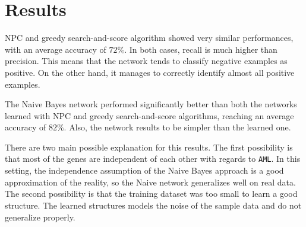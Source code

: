 \section{Results}
\label{sec:results}

NPC and greedy search-and-score algorithm showed very similar performances, with an average accuracy of $72\%$.
In both cases, recall is much higher than precision.
This means that the network tends to classify negative examples as positive.
On the other hand, it manages to correctly identify almost all positive examples.

The Naive Bayes network performed significantly better than both the networks learned with NPC and greedy search-and-score algorithms, reaching an average accuracy of $82\%$.
Also, the network results to be simpler than the learned one.

There are two main possible explanation for this results.
The first possibility is that most of the genes are independent of each other with regards to \texttt{AML}.
In this setting, the independence assumption of the Naive Bayes approach is a good approximation of the reality, so the Naive network generalizes well on real data.
The second possibility is that the training dataset was too small to learn a good structure.
The learned structures models the noise of the sample data and do not generalize properly.
